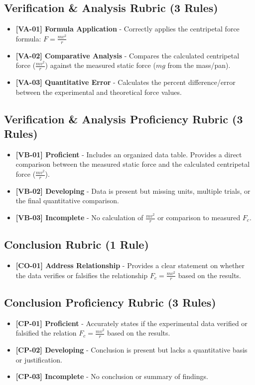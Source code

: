 \documentclass{article}
\begin{document}
\subsection*{Verification \& Analysis Rubric (3 Rules)}
\begin{itemize}
\item \textbf{ [VA-01] Formula Application } - Correctly applies the centripetal force formula: $ F = \frac { m v^2 } { r } $
\item \textbf{ [VA-02] Comparative Analysis } - Compares the calculated centripetal force ($ \frac { mv^2 }{ r } $) against the measured static force ($ m g $ from the mass/pan).
\item \textbf{ [VA-03] Quantitative Error } - Calculates the percent difference/error between the experimental and theoretical force values.
\end{itemize}

\subsection*{Verification \& Analysis Proficiency Rubric (3 Rules)}
\begin{itemize}
\item \textbf{ [VB-01] Proficient } - Includes an organized data table. Provides a direct comparison between the measured static force and the calculated centripetal force ($ \frac { mv^2 }{ r } $).
\item \textbf{ [VB-02] Developing } - Data is present but missing units, multiple trials, or the final quantitative comparison.
\item \textbf{ [VB-03] Incomplete } - No calculation of $ \frac { mv^2 }{ r } $ or comparison to measured $ F_c $.
\end{itemize}

\subsection*{Conclusion Rubric (1 Rule)}
\begin{itemize}
\item \textbf{ [CO-01] Address Relationship } - Provides a clear statement on whether the data verifies or falsifies the relationship $ F_c = \frac { m v^2 } { r } $ based on the results.
\end{itemize}

\subsection*{Conclusion Proficiency Rubric (3 Rules)}
\begin{itemize}
\item \textbf{ [CP-01] Proficient } - Accurately states if the experimental data verified or falsified the relation $ F_c = \frac { m v^2 } { r } $ based on the results.
\item \textbf{ [CP-02] Developing } - Conclusion is present but lacks a quantitative basis or justification.
\item \textbf{ [CP-03] Incomplete } - No conclusion or summary of findings.
\end{itemize}
\end{document}

